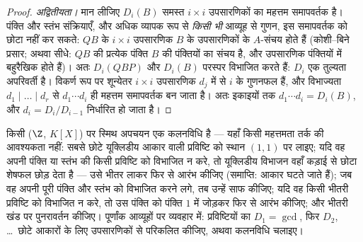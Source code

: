 \begin{proof}
\emph{अद्वितीयता।} मान लीजिए $D_i(B)$ समस्त $i \times i$ उपसारणिकों का
महत्तम समापवर्तक है। पंक्ति और स्तंभ संक्रियाएँ, और अधिक व्यापक
रूप से \emph{किसी भी} आव्यूह से गुणन, इस समापवर्तक को छोटा नहीं
कर सकते: $QB$ के $i \times i$ उपसारणिक $B$ के उपसारणिकों के
$A$-संचय होते हैं (कोशी--बिने प्रसार; अथवा सीधे: $QB$ की
प्रत्येक पंक्ति $B$ की पंक्तियों का संचय है, और उपसारणिक
पंक्तियों में बहुरैखिक होते हैं)। अतः $D_i(QBP)$ और $D_i(B)$ परस्पर
विभाजित करते हैं: $D_i$ एक तुल्यता अपरिवर्ती है। विकर्ण रूप पर
शून्येतर $i
\times i$ उपसारणिक $d_j$ में से $i$ के गुणनफल हैं, और
विभाज्यता $d_1 \mid \dots \mid d_r$ से $d_1 \cdots d_i$ ही महत्तम समापवर्तक बन जाता है। अतः
इकाइयों तक $d_1 \cdots d_i = D_i(B)$, और $d_i =
D_i/D_{i-1}$ निर्धारित हो जाता है।
\end{proof}

\begin{method}\label{met:b3:modules:smith}
किसी  ($\Z$, $K[X]$) पर स्मिथ अपचयन एक
कलनविधि है --- यहाँ किसी महत्तमता तर्क की आवश्यकता नहीं: सबसे
छोटे यूक्लिडीय आकार वाली प्रविष्टि को स्थान $(1,1)$ पर लाइए; यदि
वह अपनी पंक्ति या स्तंभ की किसी प्रविष्टि को विभाजित न करे, तो
यूक्लिडीय विभाजन वहाँ कड़ाई से छोटा शेषफल छोड़ देता है --- उसे
भीतर लाकर फिर से आरंभ कीजिए (समाप्ति: आकार घटते जाते हैं); जब वह
अपनी पूरी पंक्ति और स्तंभ को विभाजित करने लगे, तब उन्हें साफ
कीजिए; यदि वह किसी भीतरी प्रविष्टि को विभाजित न करे, तो उस
पंक्ति को पंक्ति $1$ में जोड़कर फिर से आरंभ कीजिए; और भीतरी
खंड पर पुनरावर्तन कीजिए। पूर्णांक आव्यूहों पर व्यवहार में:
प्रविष्टियों का $D_1 = \gcd$, फिर $D_2$, \dots\ छोटे आकारों के लिए
उपसारणिकों से परिकलित कीजिए, अथवा कलनविधि चलाइए।
\end{method}

